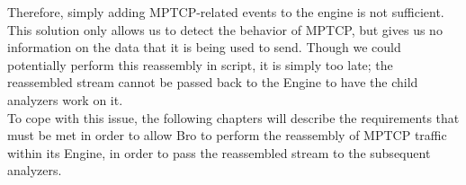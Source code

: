 Therefore, simply adding MPTCP-related events to the engine is not sufficient. This solution only allows us to detect the behavior of MPTCP, but gives us no information on the data that it is being used to send. Though we could potentially perform this reassembly in script, it is simply too late; the reassembled stream cannot be passed back to the Engine to have the child analyzers work on it. \\

To cope with this issue, the following chapters will describe the requirements that must be met in order to allow Bro to perform the reassembly of MPTCP traffic within its Engine, in order to pass the reassembled stream to the subsequent analyzers.
